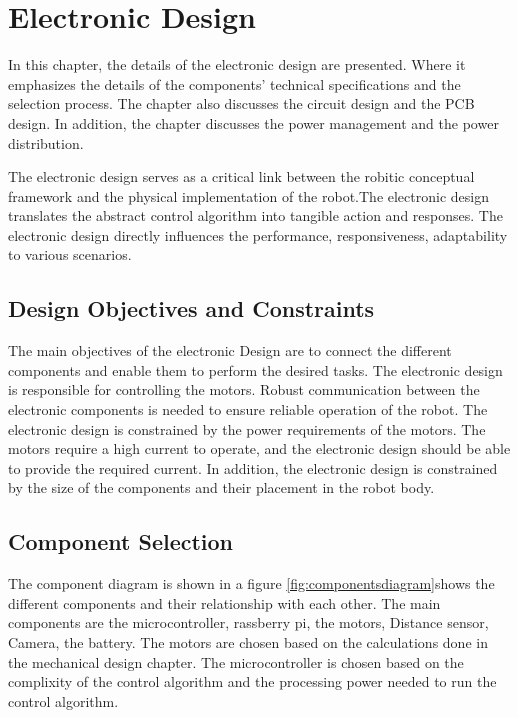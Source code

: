 \chapter{Electronic Design}

\graphicspath{{./Figures/Electronic Design/}}
In this chapter, the details of the electronic design are presented.
Where it emphasizes the details of the components' technical specifications and the selection process.
The chapter also discusses the circuit design and the PCB design.
In addition, the chapter discusses the power management and the power distribution.

The electronic design serves as a critical link between the robitic conceptual framework and the physical implementation of the robot.The electronic design translates the abstract control algorithm into tangible action and responses.
The electronic design directly influences the performance, responsiveness, adaptability to various scenarios.

\section{Design Objectives and Constraints}
The main objectives of the electronic Design are to connect the different components and enable them to perform the desired tasks.
The electronic design is responsible for controlling the motors.
Robust communication between the electronic components is needed to ensure reliable operation of the robot.
The electronic design is constrained by the power requirements of the motors.
The motors require a high current to operate, and the electronic design should be able to provide the required current.
In addition, the electronic design is constrained by the size of the components and their placement in the robot body.

\section{Component Selection}
The component diagram is shown in a figure \ref{fig:componentsdiagram}shows the different components and their relationship with each other.
The main components are the microcontroller, rassberry pi, the motors, Distance sensor, Camera, the battery. The motors are chosen based on the calculations done in the mechanical design chapter. The microcontroller is chosen based on the complixity of the control algorithm and the processing power needed to run the control algorithm.


